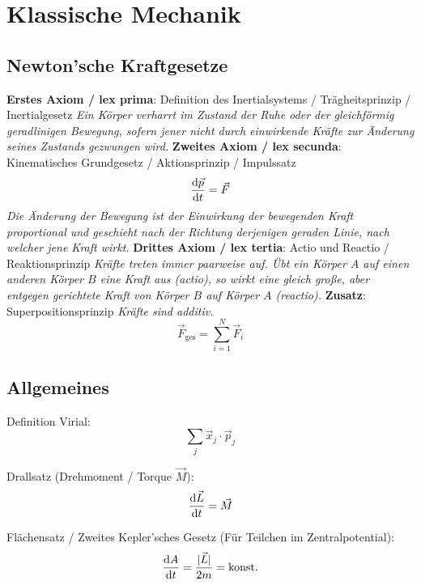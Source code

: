 \section{Klassische Mechanik}
	\subsection{Newton'sche Kraftgesetze}
		\textbf{Erstes Axiom / lex prima}: Definition des Inertialsystems / Trägheitsprinzip / Inertialgesetz \newline
			\indent \textit{Ein Körper verharrt im Zustand der Ruhe oder der gleichförmig geradlinigen Bewegung, sofern jener nicht durch einwirkende Kräfte zur Änderung seines Zustands gezwungen wird.} \nl
		\textbf{Zweites Axiom / lex secunda}: Kinematisches Grundgesetz / Aktionsprinzip / Impulssatz
			\begin{equation}
				\frac{\mathrm{d} \vec{p}}{\mathrm{d} t} = \vec{F}
			\end{equation}
			\indent \textit{Die Änderung der Bewegung ist der Einwirkung der bewegenden Kraft proportional und geschieht nach der Richtung derjenigen geraden Linie, nach welcher jene Kraft wirkt.} \nl
		\textbf{Drittes Axiom / lex tertia}: Actio und Reactio / Reaktionsprinzip \newline
			\indent \textit{Kräfte treten immer paarweise auf. Übt ein Körper $A$ auf einen anderen Körper $B$ eine Kraft aus (actio), so wirkt eine gleich große, aber entgegen gerichtete Kraft von Körper $B$ auf Körper $A$ (reactio).} \nl
		\textbf{Zusatz}: Superpositionsprinzip \newline
			\indent \textit{Kräfte sind additiv.}
			\begin{equation}
				\vec{F}_{\mathrm{ges}} = \sum_{i=1}^{N} \vec{F}_i
			\end{equation}

	\subsection{Allgemeines}
		\noindent
		Definition Virial:
		\begin{equation}
			\sum_j \vec{x}_j\cdot\vec{p}_j
		\end{equation}

		\noindent
		Drallsatz (Drehmoment / Torque $\vec{M}$):
		\begin{equation}
			\frac{\mathrm{d} \vec{L}}{\mathrm{d} t} = \vec{M}
		\end{equation}

		\noindent
		Flächensatz / Zweites Kepler'sches Gesetz (Für Teilchen im Zentralpotential):
		\begin{equation}
			\frac{\mathrm{d} A}{\mathrm{d} t} = \frac{| \vec{L} |}{2 m} = \mathrm{konst.}
		\end{equation}

